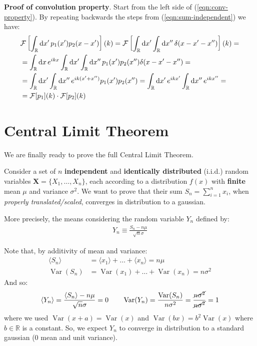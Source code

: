 \documentclass[../template.tex]{subfiles}
\begin{document}
\begin{expl}
    \textbf{Proof of convolution property}. Start from the left side of (\ref{eqn:conv-property}). By repeating backwards the steps from (\ref{eqn:sum-independent}) we have:
    \begin{align*}
        \mathcal{F}\left[\int_{\mathbb{R}} \dd{x'} p_1(x') p_2(x-x')\right](k) = \mathcal{F}\left[\int_{\mathbb{R}} \dd{x'} \int_{\mathbb{R}} \dd{x''} \delta (x-x'-x'')\right](k) = \span\\
        &= \int_{\mathbb{R}} \dd{x} e^{ikx} \int_{\mathbb{R}} \dd{x'}\int_{\mathbb{R}} \dd{x''} p_1(x') p_2(x'') \delta(x-x'-x'') =\\
        &= \int_{\mathbb{R}} \dd{x'} \int_{\mathbb{R}} \dd{x''} e^{ik(x'+x'')} p_1(x') p_2(x'') = \int_{\mathbb{R}} \dd{x'} e^{ikx'} \int_{\mathbb{R}} \dd{x''} e^{ikx''} = \\
        &= \mathcal{F}[p_1](k) \cdot \mathcal{F}[p_2](k)
    \end{align*}
\end{expl}

\section{Central Limit Theorem}
We are finally ready to prove the full Central Limit Theorem. 

\medskip

Consider a set of $n$ \textbf{independent} and \textbf{identically distributed} (i.i.d.) random variables $\bm{X} = \{X_1, \dots, X_n\}$, each according to a distribution $f(x)$ with \textbf{finite} mean $\mu$ and variance $\sigma^2$. We want to prove that their sum $S_n = \sum_{i=1}^n x_i$, when \textit{properly translated/scaled}, converges in distribution to a gaussian.

\medskip

More precisely, the  means considering the random variable $Y_n$ defined by:
\begin{align}\label{eqn:yn-def}
    Y_n \equiv \frac{S_n - n \mu}{\sqrt{n} \sigma} 
\end{align} 

Note that, by additivity of mean and variance:
\begin{align*}
    \langle S_n \rangle &= \langle x_1 \rangle + \dots + \langle x_n \rangle = n \mu\\
    \operatorname{Var} (S_n) &= \operatorname{Var}(x_1) + \dots + \operatorname{Var}(x_n) = n \sigma^2 
\end{align*}
And so:
\begin{align*}
    \langle Y_n \rangle = \frac{\langle S_n \rangle - n \mu}{\sqrt{n} \sigma} = 0 \qquad \operatorname{Var}(Y_n) = \frac{\operatorname{Var}(S_n) }{n \sigma^2} = \frac{\cancel{n \sigma^2}}{\cancel{n \sigma^2}} = 1    
\end{align*}
where we used $\operatorname{Var}(x+a) = \operatorname{Var}(x)$ and $\operatorname{Var}(bx) = b^2 \operatorname{Var}(x)$ where $b \in \mathbb{R}$ is a constant. So, we expect $Y_n$ to converge in distribution to a standard gaussian ($0$ mean and unit variance).
\end{document}
